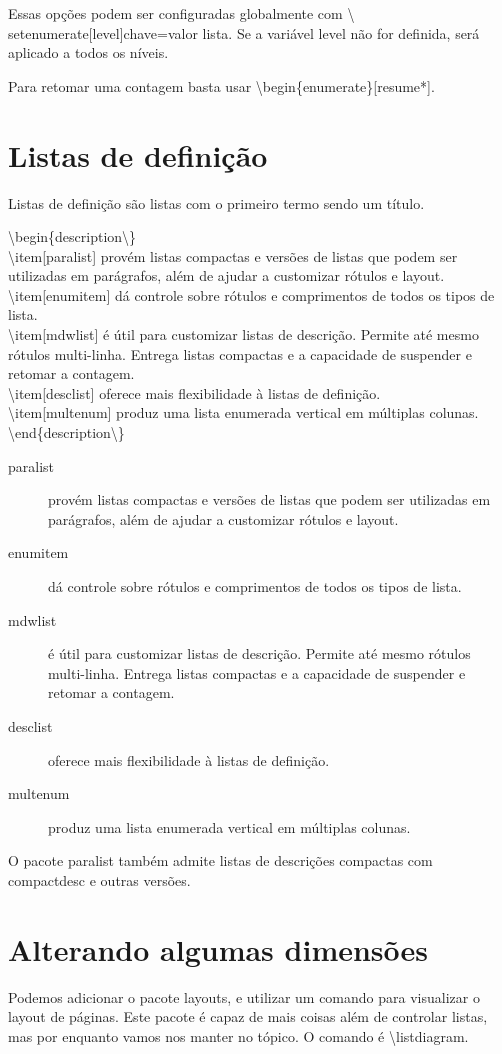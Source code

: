Essas opções podem ser configuradas globalmente com \textbackslash
setenumerate[level]{chave=valor lista}. Se a variável level não for definida,
será aplicado a todos os níveis.

Para retomar uma contagem basta usar \textbackslash begin\{enumerate\}[resume*].

\section{Listas de definição}
Listas de definição são listas com o primeiro termo sendo um título.

\noindent\textbackslash begin\{description\textbackslash \}\\
	\textbackslash item[paralist] provém listas compactas e versões de listas que podem ser utilizadas em parágrafos, além de ajudar a customizar rótulos e layout.\\
	\textbackslash item[enumitem] dá controle sobre rótulos e comprimentos de todos os tipos de lista.\\
	\textbackslash item[mdwlist] é útil para customizar listas de descrição. Permite até mesmo rótulos multi-linha. Entrega listas compactas e a capacidade de suspender e retomar a contagem.\\
	\textbackslash item[desclist] oferece mais flexibilidade à listas de definição.\\
	\textbackslash item[multenum] produz uma lista enumerada vertical em múltiplas colunas.\\
\textbackslash end\{description\textbackslash \}\\

\begin{description}
	\item[paralist] provém listas compactas e versões de listas que podem ser utilizadas em parágrafos, além de ajudar a customizar rótulos e layout.
	\item[enumitem] dá controle sobre rótulos e comprimentos de todos os tipos de lista.
	\item[mdwlist] é útil para customizar listas de descrição. Permite até mesmo rótulos multi-linha. Entrega listas compactas e a capacidade de suspender e retomar a contagem.
	\item[desclist] oferece mais flexibilidade à listas de definição.
	\item[multenum] produz uma lista enumerada vertical em múltiplas colunas.
\end{description}

O pacote paralist também admite listas de descrições compactas com compactdesc e outras versões.

\section{Alterando algumas dimensões}
Podemos adicionar o pacote layouts, e utilizar um comando para visualizar o
layout de páginas. Este pacote é capaz de mais coisas além de controlar listas,
mas por enquanto vamos nos manter no tópico. 
O comando é \textbackslash listdiagram.

\listdiagram

\newpage
